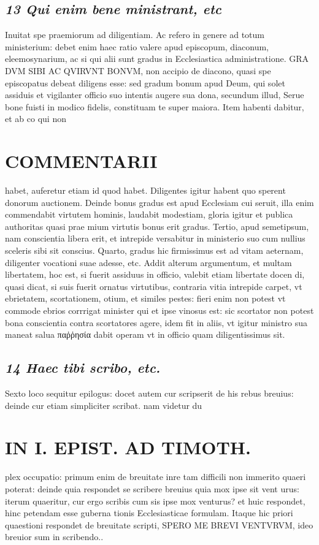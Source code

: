 \documentclass{article}
\begin{document}
\begin{pages}
\subsection*{\textit{13 Qui enim bene ministrant, etc }}\pstart Inuitat spe praemiorum ad diligentiam. Ac refero in genere ad totum ministerium: debet enim haec ratio valere apud episcopum, diaconum, eleemosynarium, ac si qui alii sunt gradus in Ecclesiastica administratione. GRA DVM SIBI AC QVIRVNT BONVM, non accipio de diacono, quasi spe episcopatus debeat diligens esse: sed gradum bonum apud Deum, qui solet assiduis et vigilanter officio suo intentis augere sua dona, secundum illud, Serue bone fuisti in modico fidelis, constituam te super maiora.  \pend\pstart Item habenti dabitur, et ab co qui non  \pend
\section*{COMMENTARII }
\marginpar{[ p.76 ]}\pstart habet, auferetur etiam id quod habet. Diligentes igitur habent quo sperent donorum auctionem. Deinde bonus gradus est apud Ecclesiam cui seruit, illa enim commendabit virtutem hominis, laudabit modestiam, gloria igitur et publica authoritas quasi prae mium virtutis bonus erit gradus. Tertio, apud semetipsum, nam conscientia libera erit, et intrepide versabitur in ministerio suo cum nullius sceleris sibi sit conscius. Quarto, gradus hic firmissimus est ad vitam aeternam, diligenter vocationi suae adesse, etc. Addit alterum argumentum, et multam libertatem, hoc est, si fuerit assiduus in officio, valebit etiam libertate docen di, quasi dicat, si suis fuerit ornatus virtutibus, contraria vitia intrepide carpet, vt ebrietatem, scortationem, otium, et similes pestes: fieri enim non potest vt commode ebrios corrrigat minister qui et ipse vinosus est: sic scortator non potest bona conscientia contra scortatores agere, idem fit in aliis, vt igitur ministro sua maneat salua παῤῥησία dabit operam vt in officio quam diligentissimus sit.  \pend
{}
{}
\subsection*{\textit{14 Haec tibi scribo, etc. }}\pstart Sexto loco sequitur epilogus: docet autem cur scripserit de his rebus breuius: deinde cur etiam simpliciter scribat. nam videtur du\pend
\section*{IN I. EPIST. AD TIMOTH. }
\marginpar{[ p.77 ]}\pstart plex occupatio: primum enim de breuitate inre tam difficili non immerito quaeri poterat: deinde quia respondet se scribere breuius quia mox ipse sit vent urus: iterum quaeritur, cur ergo scribis cum sis ipse mox venturus? et huic respondet, hinc petendam esse guberna tionis Ecclesiasticae formulam. Itaque hic priori quaestioni respondet de breuitate scripti, SPERO ME BREVI VENTVRVM, ideo breuior sum in scribendo..  \pend
{}
{}

\end{pages}
\end{document}
